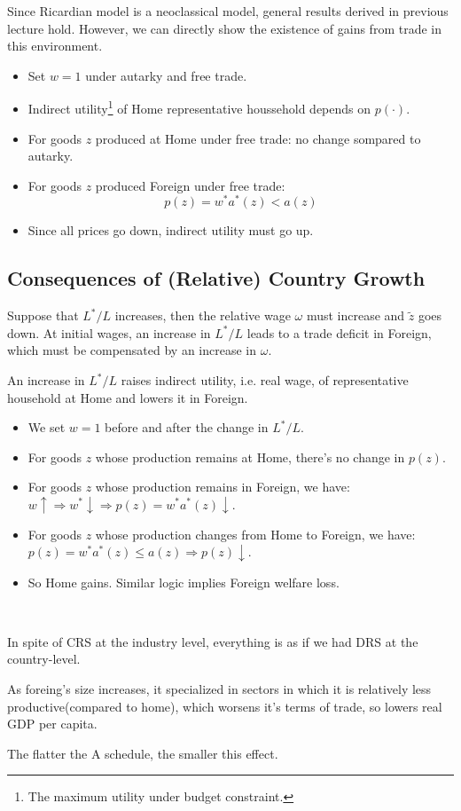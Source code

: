 Since Ricardian model is a neoclassical model, general results derived
in previous lecture hold. However, we can directly show the existence of gains from trade in this environment.

\begin{itemize}
    \item Set $w=1$ under autarky and free trade.
    \item Indirect utility\footnote{The maximum utility under budget constraint.} of Home representative houssehold depends on $p(\cdot).$
    \item For goods $z$ produced at Home under free trade: no change sompared to autarky.
    \item For goods $z$ produced Foreign under free trade:
    \[p(z) = w^* a^*(z) < a(z)\]
    \item Since all prices go down, indirect utility must go up.
\end{itemize}

\subsection{Consequences of (Relative) Country Growth}

Suppose that $L^*/L$ increases, then the relative wage $\omega$ must increase and $\tilde{z}$ goes down.
At initial wages, an increase in $L^*/L$ leads to a trade deficit in Foreign, which must be compensated by an increase in $\omega$.

An increase in $L^*/L$ raises indirect utility, i.e. real wage, of representative household at Home and lowers it in Foreign.

\begin{itemize}
    \item We set $w=1$ before and after the change in $L^*/L.$
    \item For goods $z$ whose production remains at Home, there's no change in $p(z)$.
    \item For goods $z$ whose production remains in Foreign, we have: $w \uparrow \Rightarrow w^* \downarrow \Rightarrow p(z) = w^* a^*(z) \downarrow.$
    \item For goods $z$ whose production changes from Home to Foreign, we have: $p(z) = w^* a^*(z) \leq a(z) \Rightarrow p(z) \downarrow.$
    \item So Home gains. Similar logic implies Foreign welfare loss.
\end{itemize}

\begin{note}
    \
    
    In spite of CRS at the industry level, everything is as if we had DRS at the country-level.

    As foreing's size increases, it specialized in sectors in which it is relatively less productive(compared to home),
    which worsens it's terms of trade, so lowers real GDP per capita.

    The flatter the A schedule, the smaller this effect.
\end{note}

